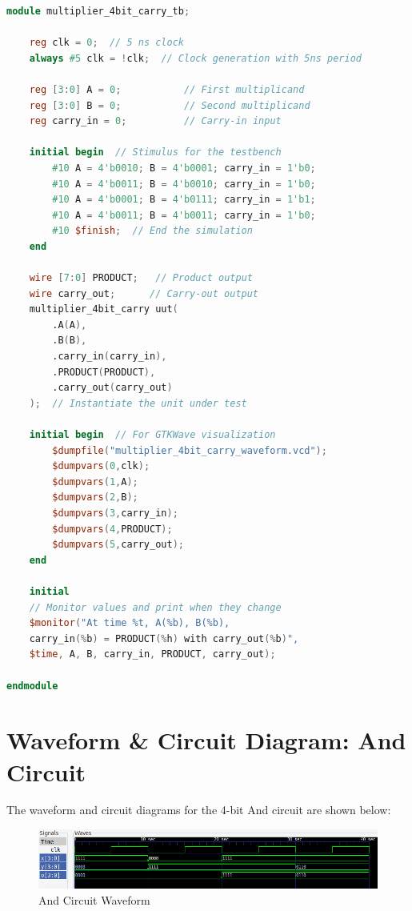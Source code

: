 \documentclass[runningheads, 12pt]{report}
\begin{document}
\begin{lstlisting}[language=Verilog, caption={Multiplication Circuit Test Bench}]
module multiplier_4bit_carry_tb;

    reg clk = 0;  // 5 ns clock
    always #5 clk = !clk;  // Clock generation with 5ns period

    reg [3:0] A = 0;           // First multiplicand
    reg [3:0] B = 0;           // Second multiplicand
    reg carry_in = 0;          // Carry-in input

    initial begin  // Stimulus for the testbench
        #10 A = 4'b0010; B = 4'b0001; carry_in = 1'b0;
        #10 A = 4'b0011; B = 4'b0010; carry_in = 1'b0;
        #10 A = 4'b0001; B = 4'b0111; carry_in = 1'b1;
        #10 A = 4'b0011; B = 4'b0011; carry_in = 1'b0;
        #10 $finish;  // End the simulation
    end

    wire [7:0] PRODUCT;   // Product output
    wire carry_out;      // Carry-out output
    multiplier_4bit_carry uut(
        .A(A),
        .B(B),
        .carry_in(carry_in),
        .PRODUCT(PRODUCT),
        .carry_out(carry_out)
    );  // Instantiate the unit under test

    initial begin  // For GTKWave visualization
        $dumpfile("multiplier_4bit_carry_waveform.vcd");
        $dumpvars(0,clk);
        $dumpvars(1,A);
        $dumpvars(2,B);
        $dumpvars(3,carry_in);
        $dumpvars(4,PRODUCT);
        $dumpvars(5,carry_out);
    end

    initial  
    // Monitor values and print when they change
    $monitor("At time %t, A(%b), B(%b), 
    carry_in(%b) = PRODUCT(%h) with carry_out(%b)", 
    $time, A, B, carry_in, PRODUCT, carry_out);

endmodule
\end{lstlisting}
\pagebreak
	
	\section{Waveform \& Circuit Diagram: And Circuit}	
	
	The waveform and circuit diagrams for the 4-bit And circuit are shown below:
	
\begin{figure}[h]
	\centering
	\includegraphics[scale =1.15]{gtk_and_4bit}
	\caption{And Circuit Waveform}
	\label{fig: gtk_and_4bit}
\end{figure}
\end{document}
